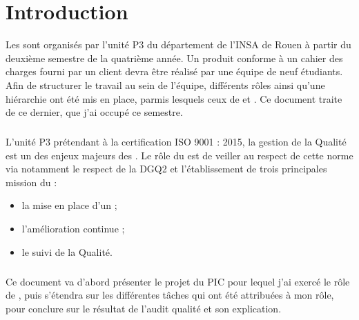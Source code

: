 \documentclass[asi]{picInsa}
\begin{document}
\couverture{}

\informationsGenerales{}
%
\begin{pagesService}
	\begin{historique}

	\end{historique}


        \begin{signatures}
        \end{signatures}
\end{pagesService}

\tableofcontents

\setcounter{chapter}{0}

\chapter{Introduction}
\label{Introduction}

Les \PIC{} sont organisés par l'unité P3 du département \ASI{} de l'INSA de Rouen à partir du deuxième semestre de la quatrième année. Un produit conforme à un cahier des charges fourni par un client devra être réalisé par une équipe de neuf étudiants. Afin de structurer le travail au sein de l'équipe, différents rôles ainsi qu'une hiérarchie ont été mis en place, parmis lesquels ceux de \CP{} et \RQ{}. Ce document traite de ce dernier, que j'ai occupé ce semestre.
\paragraph*{}
L'unité P3 prétendant à la certification ISO 9001 : 2015, la gestion de la Qualité est un des enjeux majeurs des \PICCourt{}. Le rôle du \RQ{} est de veiller au respect de cette norme via notamment le respect de la DGQ2 et l'établissement de trois principales mission du \RQCourt{} :
\begin{itemize}
\item la mise en place d'un \SMQ{} ; 
\item l'amélioration continue ;
\item le suivi de la Qualité.
\end{itemize}
\paragraph*{}
Ce document va d’abord présenter le projet du PIC \nomEquipe{} pour lequel j’ai exercé le rôle de \RQ{}, puis s’étendra sur les différentes tâches qui ont été attribuées à mon rôle, pour conclure sur le résultat de l’audit qualité et son explication.
\end{document}
